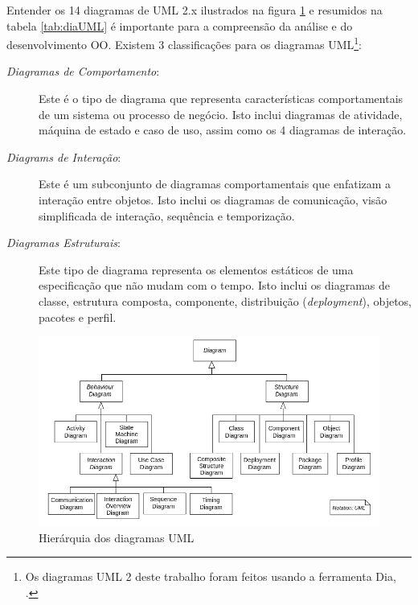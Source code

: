 Entender os 14 diagramas de UML 2.x ilustrados na figura \ref{fig:uml14dia} e resumidos na tabela \ref{tab:diaUML} é importante para a compreensão da análise e do desenvolvimento OO. Existem 3 classificações para os diagramas UML\footnote{Os diagramas UML 2 deste trabalho foram feitos usando a ferramenta Dia, .}:

\begin{description}
\item[\emph{Diagramas de Comportamento}:] Este é o tipo de diagrama que representa características comportamentais de um sistema ou processo de negócio. Isto inclui diagramas de atividade, máquina de estado e caso de uso, assim como os 4 diagramas de interação.

\item[\emph{Diagrams de Interação}:] Este é um subconjunto de diagramas comportamentais que enfatizam a interação entre objetos. Isto inclui os diagramas de comunicação, visão simplificada de interação, sequência e temporização.

\item[\emph{Diagramas Estruturais}:] Este tipo de diagrama representa os elementos estáticos de uma especificação que não mudam com o tempo. Isto inclui os diagramas de classe, estrutura composta, componente, distribuição (\textit{deployment}), objetos, pacotes e perfil.
\end{description}

\begin{figure}[h]
\begin{center}
\includegraphics[scale=0.55]{UML_diagrams_overview.png} 
\caption{Hierárquia dos diagramas UML} \label{fig:uml14dia}
\end{center}
\end{figure}

